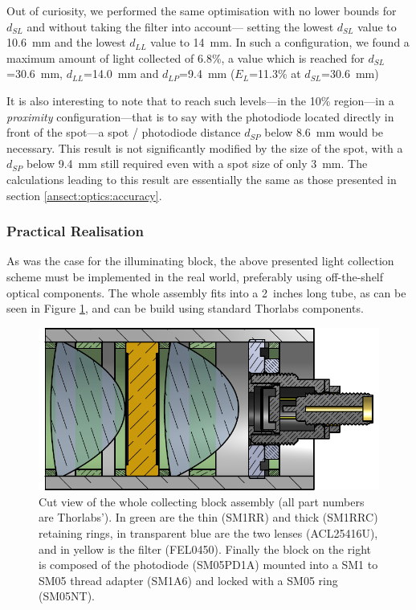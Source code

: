 Out of curiosity, we performed the same optimisation with no lower bounds for $d_{SL}$ and without taking the filter into account---\ie{} setting the lowest $d_{SL}$ value to 10.6~mm and the lowest $d_{LL}$ value to 14~mm. In such a configuration, we found a maximum amount of light collected of 6.8\%, a value which is reached for $d_{SL}$=30.6~mm, $d_{LL}$=14.0~mm and $d_{LP}$=9.4~mm ($E_L$=11.3\% at $d_{SL}$=30.6~mm)

It is also interesting to note that to reach such levels---in the 10\% region---in a \emph{proximity} configuration---that is to say with the photodiode located directly in front of the spot---a spot / photodiode distance $d_{SP}$ below 8.6~mm would be necessary. This result is not significantly modified by the size of the spot, with a $d_{SP}$ below 9.4~mm still required even with a spot size of only 3~mm. The calculations leading to this result are essentially the same as those presented in section \ref{ansect:optics:accuracy}.

\subsubsection{Practical Realisation}

As was the case for the illuminating block, the above presented light collection scheme must be implemented in the real world, preferably using off-the-shelf optical components. The whole assembly fits into a 2~inches long tube, as can be seen in Figure \ref{anfig:optics:collecting_assembly}, and can be build using standard Thorlabs components.


\begin{figure}
	\centering
	\includegraphics{2_appendices/optical_figures/collecting_assembly.pdf}
	\caption[Cut view of the whole collecting block assembly.]{Cut view of the whole collecting block assembly (all part numbers are Thorlabs'). In green are the thin (SM1RR) and thick (SM1RRC) retaining rings, in transparent blue are the two lenses (ACL25416U), and in yellow is the filter (FEL0450). Finally the block on the right is composed of the photodiode (SM05PD1A) mounted into a SM1 to SM05 thread adapter (SM1A6) and locked with a SM05 ring (SM05NT).}
	\label{anfig:optics:collecting_assembly}
\end{figure}

